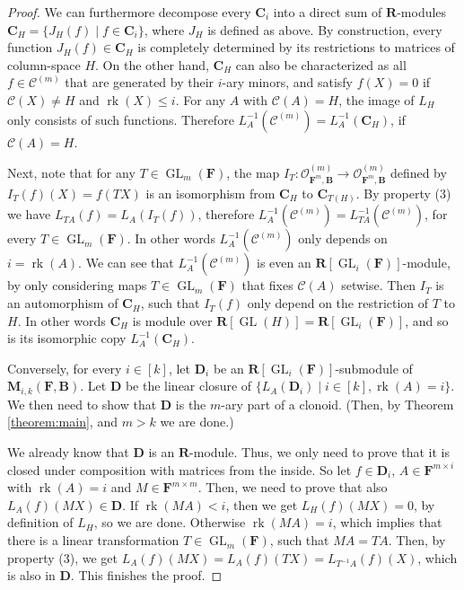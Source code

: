\documentclass[11pt]{amsart}
\theoremstyle{plain}
\theoremstyle{definition}
\newcommand{\F}{{\mathbf F}}
\newcommand{\alg}[1]{\mathbf{#1}}
\newcommand{\clone}[1]{\mathcal{#1}}
\newcommand{\clonoid}[1]{\mathcal{#1}}
\newcommand{\clodO}{\clonoid{O}}
\newcommand{\algB}{\alg{B}}
\newcommand{\algC}{\alg{C}}
\newcommand{\algD}{\alg{D}}
\newcommand{\algM}{\alg{M}}
\newcommand{\algR}{\alg{R}}
\newcommand{\cloC}{\clone{C}}
\DeclareMathOperator{\rk}{rk}
\DeclareMathOperator{\GL}{GL}
\newcommand{\Col}[1]{\mathcal{C}(#1)}
\begin{document}
\begin{proof}
We can furthermore decompose every $\algC_i$ into a direct sum of $\algR$-modules $\algC_H = \{J_H(f) \mid f \in \algC_i \}$, where $J_H$ is defined as above. By construction, every function $J_H(f) \in \algC_H$ is completely determined by its restrictions to matrices of column-space $H$. On the other hand, $\algC_H$ can also be characterized as all $f\in \cloC^{(m)}$ that are generated by their $i$-ary minors, and satisfy $f(X) = 0$ if $\Col{X} \neq H$ and $\rk(X) \leq i$. For any $A$ with $\Col{A} = H$, the image of $L_H$ only consists of such functions. Therefore $L_A^{-1}(\cloC^{(m)}) = L_A^{-1}(\algC_H)$, if $\Col{A} = H$.

Next, note that for any $T \in \GL_m(\F)$, the map $I_T \colon \clodO_{\F^m,\algB}^{(m)} \to  \clodO_{\F^m,\algB}^{(m)}$ defined by $I_T(f)(X) = f(TX)$ is an isomorphism from $\algC_H$ to $\algC_{T(H)}$. By property (3) we have $L_{TA}(f) = L_A(I_T(f))$, therefore $L_A^{-1}(\cloC^{(m)}) = L_{TA}^{-1}(\cloC^{(m)})$, for every $T\in \GL_m(\F)$. In other words $L_A^{-1}(\cloC^{(m)})$ only depends on $i = \rk(A)$. We can see that $L_A^{-1}(\cloC^{(m)})$ is even an $\algR[\GL_i(\F)]$-module, by only considering maps $T \in \GL_m(\F)$ that fixes $\Col{A}$ setwise. Then $I_T$ is an automorphism of $\algC_H$, such that $I_T(f)$ only depend on the restriction of $T$ to $H$. In other words $\algC_H$ is module over $\algR[\GL(H)] = \algR[\GL_i(\F)]$, and so is its isomorphic copy $L_A^{-1}(\algC_H)$.
 
Conversely, for every $i \in [k]$, let $\algD_i$ be an $\algR[\GL_i(\F)]$-submodule of $\algM_{i,k}(\F,\algB)$. Let $\algD$ be the linear closure of $\{L_A(\algD_i) \mid i \in [k], \rk(A) = i\}$. We then need to show that $\algD$ is the $m$-ary part of a clonoid. (Then, by Theorem \ref{theorem:main}, and $m>k$ we are done.)

We already know that $\algD$ is an $\algR$-module. Thus, we only need to prove that it is closed under composition with matrices from the inside. So let $f \in \algD_i$, $A\in \F^{m\times i}$ with $\rk(A) = i$ and $M\in \F^{m\times m}$. Then, we need to prove that also $L_A(f)(MX) \in \algD$. If $\rk(MA) <i$, then we get $L_H(f)(MX) = 0$, by definition of $L_H$, so we are done. Otherwise $\rk(MA)  = i$, which implies that there is a linear transformation $T\in \GL_m(\F)$, such that $MA = TA$. Then, by property (3), we get $L_A(f)(MX) = L_A(f)(TX) = L_{T^{-1}A}(f)(X)$, which is also in $\algD$. This finishes the proof.
\end{proof}
\end{document}
